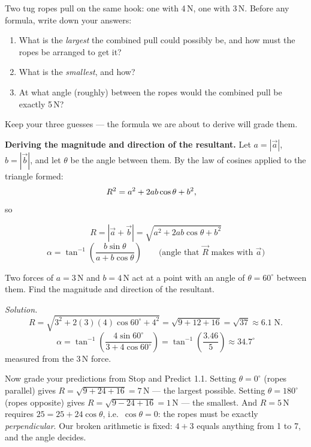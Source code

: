 \begin{predictbox}[1.1: Taming $4+3$]
Two tug ropes pull on the same hook: one with 4\,N, one with 3\,N. Before any
formula, write down your answers:
\begin{enumerate}[leftmargin=2em, itemsep=1pt]
  \item What is the \emph{largest} the combined pull could possibly be, and how
        must the ropes be arranged to get it?
  \item What is the \emph{smallest}, and how?
  \item At what angle (roughly) between the ropes would the combined pull be
        exactly 5\,N?
\end{enumerate}
Keep your three guesses --- the formula we are about to derive will grade them.
\end{predictbox}

\textbf{Deriving the magnitude and direction of the resultant.}
Let $a=|\vec{a}|$, $b=|\vec{b}|$, and let $\theta$ be the angle between them. By the law of cosines
applied to the triangle formed:
\begin{align}
  R^2 &= a^2 + 2ab\cos\theta + b^2, \notag
\end{align}
so

\begin{keybox}
\[
  R = |\vec{a}+\vec{b}| = \sqrt{a^2 + 2ab\cos\theta + b^2}
\]
\[
  \alpha = \tan^{-1}\!\left(\frac{b\sin\theta}{a+b\cos\theta}\right)
  \qquad \text{(angle that $\vec{R}$ makes with $\vec{a}$)}
\]
\end{keybox}

\begin{workedexample}
Two forces of $a=3$\,N and $b=4$\,N act at a point with an angle of $\theta=60^\circ$ between
them. Find the magnitude and direction of the resultant.

\medskip
\textit{Solution.}
\[
  R = \sqrt{3^2 + 2(3)(4)\cos60^\circ + 4^2} = \sqrt{9+12+16} = \sqrt{37} \approx 6.1\;\text{N}.
\]
\[
  \alpha = \tan^{-1}\!\left(\frac{4\sin60^\circ}{3+4\cos60^\circ}\right)
         = \tan^{-1}\!\left(\frac{3.46}{5}\right) \approx 34.7^\circ
\]
measured from the 3\,N force.
\end{workedexample}

Now grade your predictions from Stop and Predict 1.1. Setting $\theta=0^\circ$
(ropes parallel) gives $R=\sqrt{9+24+16}=7$\,N --- the largest possible. Setting
$\theta=180^\circ$ (ropes opposite) gives $R=\sqrt{9-24+16}=1$\,N --- the
smallest. And $R=5$\,N requires $25 = 25 + 24\cos\theta$, i.e.\
$\cos\theta=0$: the ropes must be exactly \emph{perpendicular}. Our broken
arithmetic is fixed: $4+3$ equals anything from 1 to 7, and the angle decides.

